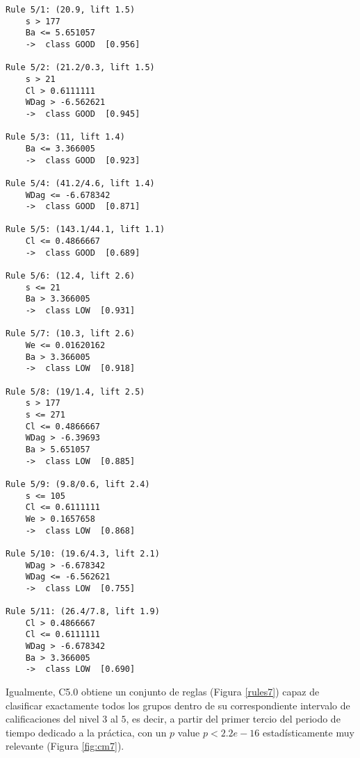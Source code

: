 \begin{tcolorbox}[title=Reglas de clasificación para identificar grupos de tipo \emph{``LOW''}.]
  \makeatletter
  \makeatother
\begin{multicols}{2}
    \begin{verbatim}
Rule 5/1: (20.9, lift 1.5)
	s > 177
	Ba <= 5.651057
	->  class GOOD  [0.956]

Rule 5/2: (21.2/0.3, lift 1.5)
	s > 21
	Cl > 0.6111111
	WDag > -6.562621
	->  class GOOD  [0.945]

Rule 5/3: (11, lift 1.4)
	Ba <= 3.366005
	->  class GOOD  [0.923]

Rule 5/4: (41.2/4.6, lift 1.4)
	WDag <= -6.678342
	->  class GOOD  [0.871]

Rule 5/5: (143.1/44.1, lift 1.1)
	Cl <= 0.4866667
	->  class GOOD  [0.689]

Rule 5/6: (12.4, lift 2.6)
	s <= 21
	Ba > 3.366005
	->  class LOW  [0.931]

Rule 5/7: (10.3, lift 2.6)
	We <= 0.01620162
	Ba > 3.366005
	->  class LOW  [0.918]

Rule 5/8: (19/1.4, lift 2.5)
	s > 177
	s <= 271
	Cl <= 0.4866667
	WDag > -6.39693
	Ba > 5.651057
	->  class LOW  [0.885]

Rule 5/9: (9.8/0.6, lift 2.4)
	s <= 105
	Cl <= 0.6111111
	We > 0.1657658
	->  class LOW  [0.868]

Rule 5/10: (19.6/4.3, lift 2.1)
	WDag > -6.678342
	WDag <= -6.562621
	->  class LOW  [0.755]

Rule 5/11: (26.4/7.8, lift 1.9)
	Cl > 0.4866667
	Cl <= 0.6111111
	WDag > -6.678342
	Ba > 3.366005
	->  class LOW  [0.690]
    \end{verbatim}
  \end{multicols}
\label{rules1}
\end{tcolorbox}

Igualmente, C5.0 obtiene un conjunto de reglas (Figura \ref{rules7}) capaz de clasificar exactamente todos los grupos dentro de su correspondiente intervalo de calificaciones del nivel $3$ al $5$, es decir, a partir del primer tercio del periodo de tiempo dedicado a la práctica, con un $p$ value $p < 2.2e-16$ estadísticamente muy relevante (Figura \ref{fig:cm7}).

